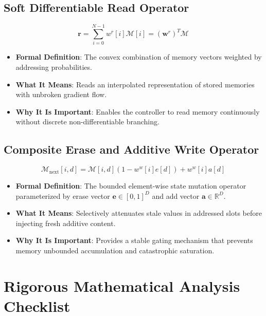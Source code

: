 \documentclass[11pt,a4paper]{article}
\theoremstyle{definition}
\begin{document}
\subsection{Soft Differentiable Read Operator}
{\boldmath
\begin{equation}
\mathbf{r} = \sum_{i=0}^{N-1} w^r[i] \mathcal{M}[i] = (\mathbf{w}^r)^T \mathcal{M}
\end{equation}
}
\begin{itemize}
    \item \textbf{Formal Definition}: The convex combination of memory vectors weighted by addressing probabilities.
    \item \textbf{What It Means}: Reads an interpolated representation of stored memories with unbroken gradient flow.
    \item \textbf{Why It Is Important}: Enables the controller to read memory continuously without discrete non-differentiable branching.
\end{itemize}

\subsection{Composite Erase and Additive Write Operator}
{\boldmath
\begin{equation}
\mathcal{M}_{\text{next}}[i, d] = \mathcal{M}[i, d] (1 - w^w[i] e[d]) + w^w[i] a[d]
\end{equation}
}
\begin{itemize}
    \item \textbf{Formal Definition}: The bounded element-wise state mutation operator parameterized by erase vector $\mathbf{e} \in [0, 1]^D$ and add vector $\mathbf{a} \in \mathbb{R}^D$.
    \item \textbf{What It Means}: Selectively attenuates stale values in addressed slots before injecting fresh additive content.
    \item \textbf{Why It Is Important}: Provides a stable gating mechanism that prevents memory unbounded accumulation and catastrophic saturation.
\end{itemize}

\section{Rigorous Mathematical Analysis Checklist}
\end{document}
